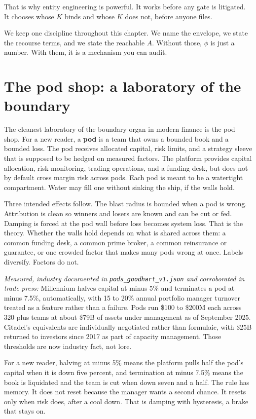 That is why entity engineering is powerful. It works before any gate is litigated. It chooses whose $K$ binds and whose $K$ does not, before anyone files.

We keep one discipline throughout this chapter. We name the envelope, we state the recourse terms, and we state the reachable $A$. Without those, $\phi$ is just a number. With them, it is a mechanism you can audit.

\section{The pod shop: a laboratory of the boundary}

The cleanest laboratory of the boundary organ in modern finance is the pod shop. For a new reader, a \textbf{pod} is a team that owns a bounded book and a bounded loss. The pod receives allocated capital, risk limits, and a strategy sleeve that is supposed to be hedged on measured factors. The platform provides capital allocation, risk monitoring, trading operations, and a funding desk, but does not by default cross margin risk across pods. Each pod is meant to be a watertight compartment. Water may fill one without sinking the ship, if the walls hold.

Three intended effects follow. The blast radius is bounded when a pod is wrong. Attribution is clean so winners and losers are known and can be cut or fed. Damping is forced at the pod wall before loss becomes system loss. That is the theory. Whether the walls hold depends on what is shared across them: a common funding desk, a common prime broker, a common reinsurance or guarantee, or one crowded factor that makes many pods wrong at once. Labels diversify. Factors do not.

\textit{Measured, industry documented in \texttt{pods\_goodhart\_v1.json} and corroborated in trade press:} Millennium halves capital at minus 5\% and terminates a pod at minus 7.5\%, automatically, with 15 to 20\% annual portfolio manager turnover treated as a feature rather than a failure. Pods run \$100 to \$200M each across 320 plus teams at about \$79B of assets under management as of September 2025. Citadel's equivalents are individually negotiated rather than formulaic, with \$25B returned to investors since 2017 as part of capacity management. Those thresholds are now industry fact, not lore.

For a new reader, halving at minus 5\% means the platform pulls half the pod's capital when it is down five percent, and termination at minus 7.5\% means the book is liquidated and the team is cut when down seven and a half. The rule has memory. It does not reset because the manager wants a second chance. It resets only when risk does, after a cool down. That is damping with hysteresis, a brake that stays on.

